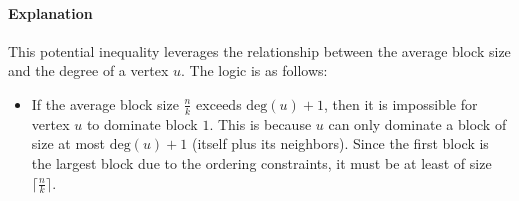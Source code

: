 \paragraph{Explanation} This potential inequality leverages the relationship between the average block size and the degree of a vertex $u$. The logic is as follows:
\begin{itemize}
    \item If the average block size $\frac{n}{k}$ exceeds $\text{deg}(u) + 1$, then it is impossible for vertex $u$ to dominate block $1$. This is because $u$ can only dominate a block of size at most $\text{deg}(u) + 1$ (itself plus its neighbors). Since the first block is the largest block due to the ordering constraints, it must be at least of size $\lceil \frac{n}{k} \rceil$.
\end{itemize}
